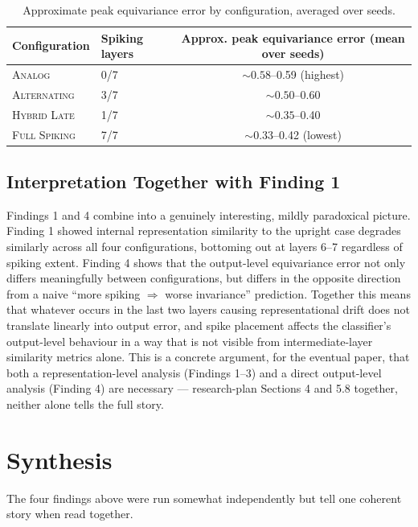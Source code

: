 \documentclass[11pt]{article}
\newcommand{\Analog}{\textsc{Analog}}
\newcommand{\Alternating}{\textsc{Alternating}}
\newcommand{\FullSpiking}{\textsc{Full Spiking}}
\newcommand{\HybridLate}{\textsc{Hybrid Late}}
\begin{document}
\begin{table}[H]
\centering
\begin{tabular}{@{}llc@{}}
\toprule
\textbf{Configuration} & \textbf{Spiking layers} & \textbf{Approx. peak equivariance error (mean over seeds)} \\
\midrule
\Analog & 0/7 & $\sim 0.58$--0.59 (highest) \\
\Alternating & 3/7 & $\sim 0.50$--0.60 \\
\HybridLate & 1/7 & $\sim 0.35$--0.40 \\
\FullSpiking & 7/7 & $\sim 0.33$--0.42 (lowest) \\
\bottomrule
\end{tabular}
\caption{Approximate peak equivariance error by configuration, averaged over seeds.}
\label{tab:peakerr}
\end{table}

\subsection{Interpretation Together with Finding 1}

Findings 1 and 4 combine into a genuinely interesting, mildly paradoxical picture. Finding 1 showed
internal representation similarity to the upright case degrades similarly across all four
configurations, bottoming out at layers 6--7 regardless of spiking extent. Finding 4 shows that the
output-level equivariance error not only differs meaningfully between configurations, but differs in
the opposite direction from a naive ``more spiking $\Rightarrow$ worse invariance'' prediction.
Together this means that whatever occurs in the last two layers causing representational drift does
not translate linearly into output error, and spike placement affects the classifier's output-level
behaviour in a way that is not visible from intermediate-layer similarity metrics alone. This is a
concrete argument, for the eventual paper, that both a representation-level analysis (Findings 1--3)
and a direct output-level analysis (Finding 4) are necessary --- research-plan Sections 4 and 5.8
together, neither alone tells the full story.

\section{Synthesis}
\label{sec:synthesis}

The four findings above were run somewhat independently but tell one coherent story when read
together.
\end{document}
